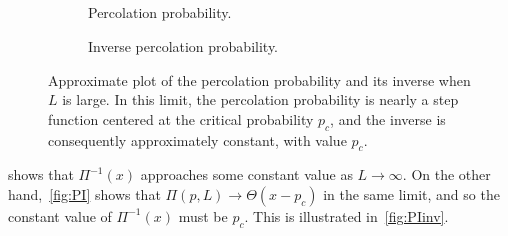 \documentclass[11pt,british,a4paper]{report}
\begin{document}
\subsection{}
\begin{figure}[H]
    \centering
    \begin{subfigure}[b]{0.45\textwidth}
        \caption{Percolation probability.}%
    \end{subfigure}\quad
    \begin{subfigure}[b]{0.45\textwidth}
        \caption{Inverse percolation probability.}%
    \end{subfigure}
    \caption{Approximate plot of the percolation probability and its inverse when \(L\) is large. In this limit, the percolation probability is nearly a step function centered at the critical probability \(p_c\), and the inverse is consequently approximately constant, with value \(p_c\).}%
    \label{fig:PIinv}
\end{figure}
 shows that \(\Pi^{-1}(x)\) approaches some constant value as \(L\to\infty\). On the other hand,~\vref{fig:PI} shows that \(\Pi(p,L)\to \Theta(x-p_c)\) in the same limit, and so the constant value of \(\Pi^{-1}(x)\) must be \(p_c\). This is illustrated in~\vref{fig:PIinv}.
\end{document}
